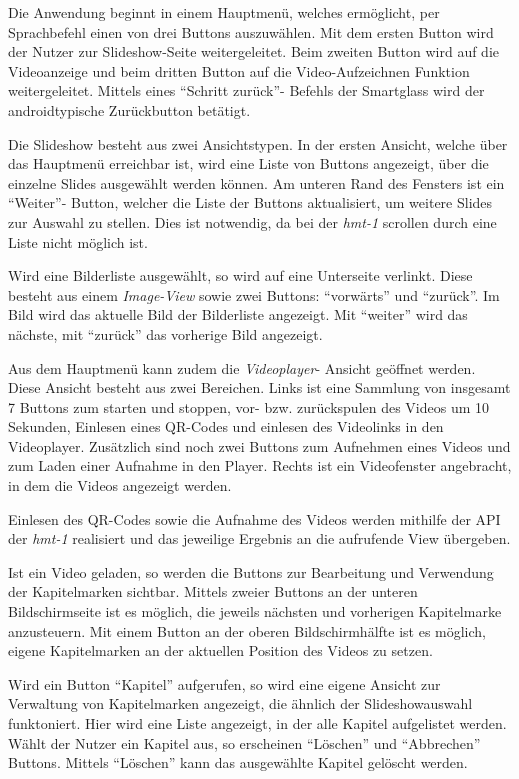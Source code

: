 Die Anwendung beginnt in einem Hauptmenü, welches ermöglicht, per Sprachbefehl einen von drei Buttons auszuwählen. Mit dem ersten Button wird der Nutzer zur Slideshow-Seite weitergeleitet. Beim zweiten Button wird auf die Videoanzeige und beim dritten Button auf die Video-Aufzeichnen Funktion weitergeleitet. Mittels eines \enquote{Schritt zurück}- Befehls der Smartglass wird der androidtypische Zurückbutton betätigt.
%

%
Die Slideshow besteht aus zwei Ansichtstypen. In der ersten Ansicht, welche über das Hauptmenü erreichbar ist, wird eine Liste von Buttons angezeigt, über die einzelne Slides ausgewählt werden können. Am unteren Rand des Fensters ist ein \enquote{Weiter}- Button, welcher die Liste der Buttons aktualisiert, um weitere Slides zur Auswahl zu stellen. Dies ist notwendig, da bei der \emph{hmt-1} scrollen durch eine Liste nicht möglich ist.

Wird eine Bilderliste ausgewählt, so wird auf eine Unterseite verlinkt. Diese besteht aus einem \emph{Image-View} sowie zwei Buttons: \enquote{vorwärts} und \enquote{zurück}. Im Bild wird das aktuelle Bild der Bilderliste angezeigt. Mit \enquote{weiter} wird das nächste, mit \enquote{zurück} das vorherige Bild angezeigt.

Aus dem Hauptmenü kann zudem die \emph{Videoplayer}- Ansicht geöffnet werden. Diese Ansicht besteht aus zwei Bereichen. Links ist eine Sammlung von insgesamt 7 Buttons zum starten und stoppen, vor- bzw. zurückspulen des Videos um 10 Sekunden, Einlesen eines QR-Codes und einlesen des Videolinks in den Videoplayer. Zusätzlich sind noch zwei Buttons zum Aufnehmen eines Videos und zum Laden einer Aufnahme in den Player. Rechts ist ein Videofenster angebracht, in dem die Videos angezeigt werden.

Einlesen des QR-Codes sowie die Aufnahme des Videos werden mithilfe der API der \emph{hmt-1} realisiert und das jeweilige Ergebnis an die aufrufende View übergeben. 

Ist ein Video geladen, so werden die Buttons zur Bearbeitung und Verwendung der Kapitelmarken sichtbar. Mittels zweier Buttons an der unteren Bildschirmseite ist es möglich, die jeweils nächsten und vorherigen Kapitelmarke anzusteuern. Mit einem Button an der oberen Bildschirmhälfte ist es möglich, eigene Kapitelmarken an der aktuellen Position des Videos zu setzen.

Wird ein Button \enquote{Kapitel} aufgerufen, so wird eine eigene Ansicht zur Verwaltung von Kapitelmarken angezeigt, die ähnlich der Slideshowauswahl funktoniert. Hier wird eine Liste angezeigt, in der alle Kapitel aufgelistet werden. Wählt der Nutzer ein Kapitel aus, so erscheinen \enquote{Löschen} und \enquote{Abbrechen} Buttons. Mittels \enquote{Löschen} kann das ausgewählte Kapitel gelöscht werden. 
%
%
